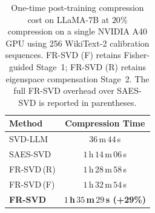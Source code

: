 

\begin{table}[t]
\centering
\small
\renewcommand{\arraystretch}{1.15}

\caption{One-time post-training compression cost on LLaMA-7B at $20\%$
compression on a single NVIDIA A40 GPU using 256 WikiText-2 calibration
sequences. FR-SVD (F) retains Fisher-guided Stage~1; FR-SVD (R) retains
eigenspace compensation Stage~2. The full FR-SVD overhead over SAES-SVD is
reported in parentheses.}
\label{tab:compression-time}

\begin{tabular}{l|c}
\toprule
\textbf{Method} & \textbf{Compression Time} \\ \midrule
SVD-LLM         & $36$\,m\,$44$\,s \\
SAES-SVD        & $1$\,h\,$14$\,m\,$06$\,s \\ \midrule
FR-SVD\,(R)     & $1$\,h\,$28$\,m\,$58$\,s \\
FR-SVD\,(F)     & $1$\,h\,$32$\,m\,$54$\,s \\
\textbf{FR-SVD} & \textbf{$1$\,h\,$35$\,m\,$29$\,s (+29\%)} \\ \bottomrule
\end{tabular}
\end{table}
